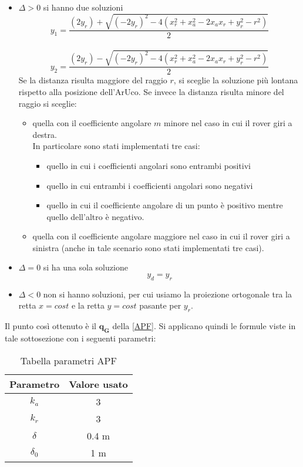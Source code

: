 \begin{itemize}
    \item $\Delta>0$ si hanno due soluzioni
        \begin{equation}
        y_1=\frac{(2y_r)+\sqrt{(-2y_r)^2-4(x_r^2+x_a^2-2x_ax_r+y_r^2-r^2)}}{2}
        \end{equation}
        \\
        \begin{equation}
        y_2=\frac{(2y_r)-\sqrt{(-2y_r)^2-4(x_r^2+x_a^2-2x_ax_r+y_r^2-r^2)}}{2}
        \end{equation}
 Se la distanza risulta maggiore del raggio $r$, si sceglie la soluzione più lontana rispetto alla posizione dell'ArUco.
        Se invece la distanza risulta minore del raggio si sceglie: 
        \begin{itemize}
            \item quella con il coefficiente angolare $m$ minore nel caso in cui il rover giri a destra. \\In particolare sono stati implementati tre casi:
            \begin{itemize}
            \item quello in cui i coefficienti angolari sono entrambi positivi
            \item quello in cui entrambi i coefficienti angolari sono negativi
            \item quello in cui il coefficiente angolare di un punto è positivo mentre quello dell'altro è negativo.
            \end{itemize}
            \item quella con il coefficiente angolare maggiore nel caso in cui il rover giri a sinistra (anche in tale scenario sono stati implementati tre casi).
        \end{itemize}
    \item $\Delta=0$ si ha una sola soluzione
    \begin{equation}
        y_d=y_r
        \end{equation}
    \item $\Delta<0$ non si hanno soluzioni, per cui usiamo la proiezione ortogonale tra la retta $x=cost$ e la retta $y=cost$ pasante per $y_r$.
\end{itemize}
Il punto così ottenuto è il $\boldsymbol{q_G}$ della \autoref{APF}.
Si applicano quindi le formule viste in tale sottosezione con i seguenti parametri: 
\begin{table} [H]
    \centering
    \begin{tabular}{|cc|}
    \hline
        Parametro & Valore usato \\  \hline
        $k_a$ &   3   \\  \hline
        $k_r$ &   3\\  \hline
        $\delta$ & 0.4  m \\  \hline
        $\delta_0$ &  1  m\\  \hline
    \end{tabular}
    \caption{Tabella parametri APF}
    \label{tab:APF} 
\end{table}

